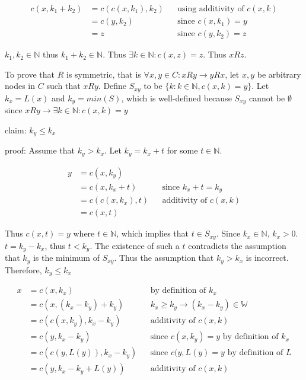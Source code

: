 \documentclass[11pt]{article}
\begin{document}
    \begin{align*}
        \text{$c(x,k_{1}+k_{2})$} &= \text{$c(c(x,k_{1}),k_{2})$} && \text{using additivity of $c(x,k)$} \\
        &= \text{$c(y,k_{2})$} && \text{since $c(x,k_{1})=y$} \\
        &= \text{$z$} && \text{since $c(y,k_{2})=z$}
    \end{align*}

    $k_{1}, k_{2} \in \mathbb{N}$ thus $k_{1}+k_{2} \in \mathbb{N}$. Thus $\exists k \in \mathbb{N}: c(x,z) = z$. Thus $xRz$.

    To prove that $R$ is symmetric, that is $\forall x,y \in C: xRy \rightarrow yRx$, let $x,y$ be arbitrary nodes in $C$ such that $xRy$. Define $S_{xy}$ to be $\{k: k \in \mathbb{N}, c(x,k) = y\}$. Let $k_{x} = L(x)$ and $k_{y} = min(S)$, which is well-defined because $S_{xy}$ cannot be $\emptyset$ since $xRy \rightarrow \exists k \in \mathbb{N}: c(x,k) = y$

    claim: $k_{y} \leq k_{x}$

    proof:
    Assume that $k_{y} > k_{x}$. Let $k_{y} = k_{x} + t$ for some $t \in \mathbb{N}$.

    \begin{align*}
        \text{$y$} &= \text{$c(x,k_{y})$} && \text{} \\
        &= \text{$c(x,k_{x}+t)$} && \text{since $k_{x}+t=k_{y}$} \\
        &= \text{$c(c(x,k_{x}),t)$} && \text{additivity of $c(x,k)$} \\
        &= \text{$c(x,t)$} && \text{}
    \end{align*}

    Thus $c(x,t)=y$ where $t\in\mathbb{N}$, which implies that $t\in S_{xy}$. Since $k_{x}\in\mathbb{N}$, $k_{x}>0$. $t=k_{y}-k_{x}$, thus $t<k_{y}$. The existence of such a $t$ contradicts the assumption that $k_{y}$ is the minimum of $S_{xy}$. Thus the assumption that $k_{y}>k_{x}$ is incorrect. Therefore, $k_{y} \leq k_{x}$

    \begin{align*}
        \text{$x$} &= \text{$c(x,k_{x})$} && \text{by definition of $k_{x}$} \\
        &= \text{$c(x,(k_{x}-k_{y})+k_{y})$} && \text{$k_{x}\geq k_{y} \rightarrow (k_{x}-k_{y}) \in \mathbb{W}$} \\
        &= \text{$c(c(x,k_{y}),k_{x}-k_{y})$} && \text{additivity of $c(x,k)$} \\
        &= \text{$c(y,k_{x}-k_{y})$} && \text{since $c(x,k_{y})=y$ by definition of $k_{x}$} \\
        &= \text{$c(c(y,L(y)),k_{x}-k_{y})$} && \text{since $c(y,L(y)=y$ by definition of $L$} \\
        &= \text{$c(y,k_{x}-k_{y}+L(y))$} && \text{additivity of $c(x,k)$}
    \end{align*}
\end{document}
